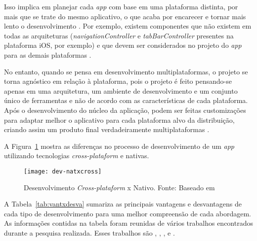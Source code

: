 Isso implica em planejar cada \textit{app} com base em uma plataforma distinta, por mais que se trate do mesmo aplicativo, o que acaba por encarecer 
e tornar mais lento o desenvolvimento \cite{kassas_taxonomy_2015}. Por exemplo, existem componentes que não existem em todas as arquiteturas (\textit{navigationController} e 
\textit{tabBarController} presentes na plataforma iOS, por exemplo) e que devem ser considerados no projeto do \textit{app} para as demais plataformas \cite{shakshuki_4th_2013}.

No entanto, quando se pensa em desenvolvimento multiplataformas, o projeto se torna agnóstico em relação à plataforma, pois o projeto é feito pensando-se 
apenas em uma arquitetura, um ambiente de desenvolvimento e um conjunto único de ferramentas e não de acordo com as características de cada plataforma. Após o desenvolvimento do núcleo da
aplicação, podem ser feitas customizações para adaptar melhor o aplicativo para cada plataforma alvo da distribuição, criando assim um produto final verdadeiramente multiplataformas \cite{corral_ant_2012}.

A Figura~\ref{fig:dev-natxcross} mostra as diferenças no processo de desenvolvimento de um \textit{app} utilizando tecnologias \textit{cross-plataform} e 
nativas.

\begin{figure}[H]
  \centering
    \texttt{[image: dev-natxcross]}
    \caption[Desenvolvimento \textit{Cross-plataform} x Nativo]{ Desenvolvimento \textit{Cross-plataform} x Nativo. Fonte: Baseado em \cite{corral_ant_2012}}
	\label{fig:dev-natxcross}
\end{figure}

A Tabela~\ref{tab:vantxdesva} sumariza as principais vantagens e desvantagens de cada tipo de desenvolvimento para uma melhor compreensão de cada abordagem. 
As informações contidas na tabela foram reunidas de vários trabalhos encontrados durante a pesquisa realizada. Esses trabalhos são , 
, ,  e . 

